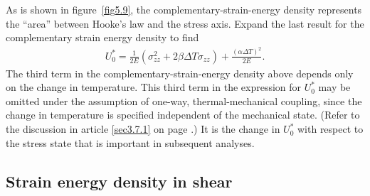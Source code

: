 \documentclass{AeroStructure-ERJohnson}
\begin{document}
\noindent As is shown in figure~\ref{fig5.9}, the complementary-strain-energy density represents the ``area'' between Hooke's law and the stress axis. Expand the last result for the complementary strain energy density to find
\begin{align}\label{eq5.41}
U_{0}^{*}=\frac{1}{2 E}(\sigma_{z z}^{2}+2 \beta \Delta T \sigma_{z z})+\frac{(\alpha \Delta T)^{2}}{2 E}.
\end{align}
The third term in the complementary-strain-energy density above depends only on the change in temperature. This third term in the expression for $U_{0}^{*}$ may be omitted under the assumption of one-way, thermal-mechanical coupling, since the change in temperature is specified independent of the mechanical state. (Refer to the discussion in article \ref{sec3.7.1} on page \pageref{sec3.7.1}.) It is the change in $U_{0}^{*}$ with respect to the stress state that is important in subsequent analyses.


\subsection{Strain energy density in shear}\label{sec5.3.3}
\end{document}
